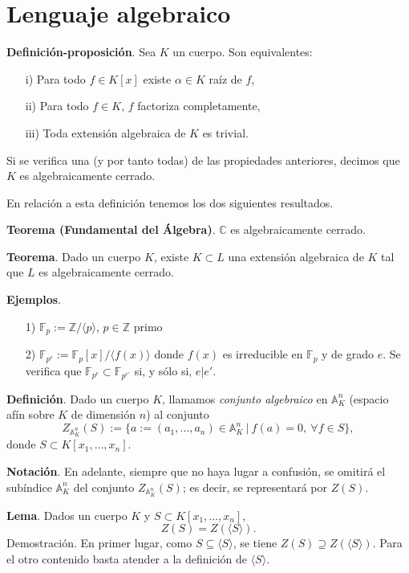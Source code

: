 \documentclass[a4paper,12pt]{article}
\newcommand{\Z}{\mathbb{Z}}
\newcommand{\C}{\mathbb{C}}
\newcommand{\A}{\mathbb{A}}
\begin{document}
\section{Lenguaje algebraico}
\textbf{Definición-proposición}. Sea $K$ un cuerpo. Son equivalentes:\begin{itemize}
    \item[i)] Para todo $f\in K[x]$ existe $\alpha\in K$ raíz de $f$,
    \item[ii)] Para todo $f\in K$, $f$ factoriza completamente,
    \item[iii)] Toda extensión algebraica de $ K$ es trivial.
\end{itemize}
Si se verifica una (y por tanto todas) de las propiedades anteriores, decimos que $ K$ es algebraicamente cerrado.

En relación a esta definición tenemos los dos siguientes resultados.

\textbf{Teorema (Fundamental del Álgebra)}. $\C$ es algebraicamente cerrado.

\textbf{Teorema}. Dado un cuerpo $K$, existe $K\subset L$ una extensión algebraica de $K$ tal que $L$ es algebraicamente cerrado.

\textbf{Ejemplos}.\begin{itemize}
    \item[1)] $\mathbb{F}_p:=\Z/\langle p\rangle$, $p\in\Z$ primo
    \item[2)] $\mathbb{F}_{p^e}:=\mathbb{F}_p[x]/\langle f(x)\rangle$ donde $f(x)$ es irreducible en $\mathbb{F}_p$ y de grado $e$. Se verifica que $\mathbb{F}_{p^{e}}\subset\mathbb{F}_{p^{e'}}$ si, y sólo si, $e|e'$.
\end{itemize}

\textbf{Definición}. Dado un cuerpo $K$, llamamos \textit{conjunto algebraico} en $\A_K^n$ (espacio afín sobre $K$ de dimensión $n$) al conjunto$$Z_{\A_K^n}(S):=\{a:=(a_1,\dots,a_n)\in\A_K^n\ |\ f(a)=0,\ \forall f\in S\},$$donde $S\subset K[x_1,\dots,x_n]$.

\textbf{Notación}. En adelante, siempre que no haya lugar a confusión, se omitirá el subíndice $\A_K^n$ del conjunto $Z_{\A_K^n}(S)$; es decir, se representará por $Z(S)$.

\textbf{Lema}. Dados un cuerpo $K$ y $S\subset K[x_1,\dots,x_n]$,$$Z(S)=Z(\langle S\rangle).$$
Demostración. En primer lugar, como $S\subseteq \langle S\rangle$, se tiene $Z(S)\supseteq Z(\langle S\rangle)$. Para el otro contenido basta atender a la definición de $\langle S\rangle$.
\end{document}
